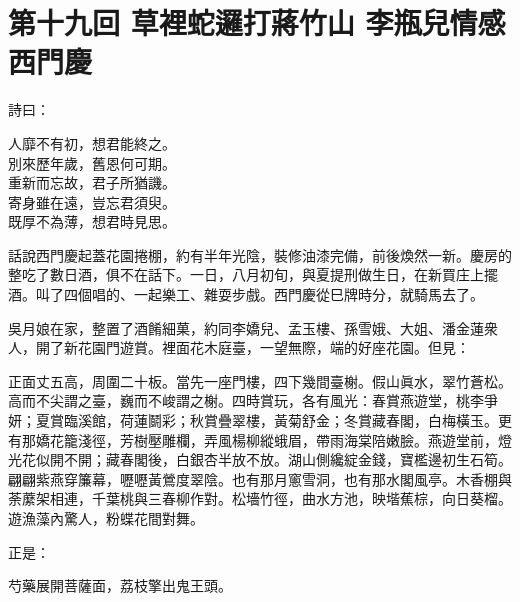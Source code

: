 
\chapter*{第十九回 草裡蛇邏打蔣竹山 李瓶兒情感西門慶}


詩曰：

\begin{myquote}
人靡不有初，想君能終之。\\別來歷年歲，舊恩何可期。\\重新而忘故，君子所猶譏。\\寄身雖在遠，豈忘君須臾。\\既厚不為薄，想君時見思。
\end{myquote}

話說西門慶起蓋花園捲棚，約有半年光陰，裝修油漆完備，前後煥然一新。慶房的整吃了數日酒，俱不在話下。一日，八月初旬，與夏提刑做生日，在新買庄上擺酒。叫了四個唱的、一起樂工、雜耍步戲。西門慶從巳牌時分，就騎馬去了。

吳月娘在家，整置了酒餚細菓，約同李嬌兒、孟玉樓、孫雪娥、大姐、潘金蓮衆人，開了新花園門遊賞。裡面花木庭臺，一望無際，端的好座花園。但見：

\begin{myquote}
正面丈五高，周圍二十板。當先一座門樓，四下幾間臺榭。假山眞水，翠竹蒼松。高而不尖謂之臺，巍而不峻謂之榭。四時賞玩，各有風光：春賞燕遊堂，桃李爭妍；夏賞臨溪館，荷蓮鬬彩；秋賞疊翠樓，黃菊舒金；冬賞藏春閣，白梅橫玉。更有那嬌花籠淺徑，芳樹壓雕欄，弄風楊柳縱蛾眉，帶雨海棠陪嫩臉。燕遊堂前，燈光花似開不開；藏春閣後，白銀杏半放不放。湖山側纔綻金錢，寶檻邊初生石筍。翩翩紫燕穿簾幕，嚦嚦黃鶯度翠陰。也有那月窻雪洞，也有那水閣風亭。木香棚與荼䕷架相連，千葉桃與三春柳作對。松墻竹徑，曲水方池，映堦蕉棕，向日葵榴。遊漁藻內驚人，粉蝶花間對舞。
\end{myquote}

正是：

\begin{myquote}
芍藥展開菩薩面，荔枝擎出鬼王頭。
\end{myquote}

